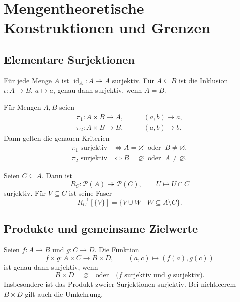 \chapter{Mengentheoretische Konstruktionen und Grenzen}
\label{b07guide:ch:constructions}

\section{Elementare Surjektionen}

\begin{theorem}
Für jede Menge $A$ ist
$\operatorname{id}_A\colon A\twoheadrightarrow A$ surjektiv.
Für $A\subseteq B$ ist die Inklusion
$\iota\colon A\to B$, $a\mapsto a$, genau dann surjektiv,
wenn $A=B$.
\end{theorem}

\begin{theorem}
\label{b07guide:thm:projections}
Für Mengen $A,B$ seien
\[
 \begin{aligned}
 \pi_1\colon A\times B\to A,&\qquad (a,b)\mapsto a,\\
 \pi_2\colon A\times B\to B,&\qquad (a,b)\mapsto b.
 \end{aligned}
\]
Dann gelten die genauen Kriterien
\[
 \begin{aligned}
 \pi_1\text{ surjektiv}&\Longleftrightarrow
                    A=\varnothing\ \text{ oder }\ B\ne\varnothing,\\
 \pi_2\text{ surjektiv}&\Longleftrightarrow
                    B=\varnothing\ \text{ oder }\ A\ne\varnothing.
 \end{aligned}
\]
\end{theorem}

\begin{theorem}
Seien $C\subseteq A$. Dann ist
\[
 R_C\colon\mathcal P(A)\twoheadrightarrow\mathcal P(C),
 \qquad U\mapsto U\cap C
\]
surjektiv. Für $V\subseteq C$ ist seine Faser
\[
 R_C^{-1}[\{V\}]
   =\{V\cup W\mid W\subseteq A\setminus C\}.
\]
\end{theorem}

\section{Produkte und gemeinsame Zielwerte}

\begin{theorem}
\label{b07guide:thm:product}
Seien $f\colon A\to B$ und $g\colon C\to D$. Die Funktion
\[
 f\times g\colon A\times C\to B\times D,\qquad
 (a,c)\mapsto(f(a),g(c))
\]
ist genau dann surjektiv, wenn
\[
 B\times D=\varnothing
 \quad\text{oder}\quad
 \bigl(f\text{ surjektiv und }g\text{ surjektiv}\bigr).
\]
Insbesondere ist das Produkt zweier Surjektionen surjektiv.
Bei nichtleerem $B\times D$ gilt auch die Umkehrung.
\end{theorem}

